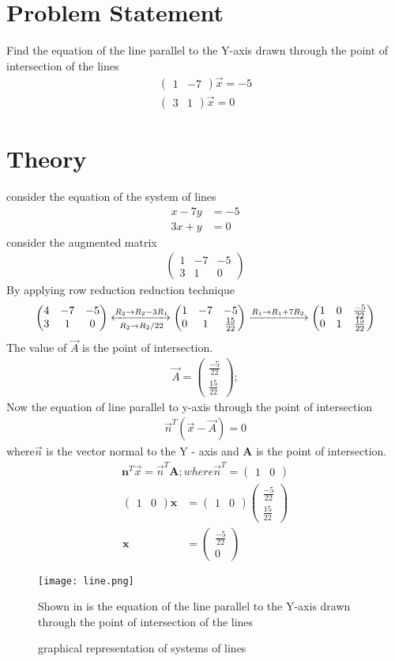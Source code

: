 \documentclass{article}
\renewcommand{\vec}[1]{\mathbf{#1}}
\newcommand{\myvec}[1]{\ensuremath{\begin{pmatrix}#1\end{pmatrix}}}
\begin{document}
\section{Problem Statement}
Find the equation of the line parallel to the Y-axis drawn through the point of intersection of the lines
\begin{align}
\myvec{1 & -7}\Vec{x}  =-5 \\ \myvec{3 & 1}\Vec{x}= 0
\end{align}
\section{Theory}
consider the equation of the system of lines
\begin{align}
x - 7y & = -5 \\
3x + y & = 0
\end{align}
 consider the augmented matrix
 \begin{align}
 \myvec{1 & -7 & -5 \\ 3 & 1 & 0}
 \end{align}
 By applying row reduction reduction technique 
 \begin{align}
\myvec{4 & -7 & -5\\ 3 & 1 & 0}
	\xleftrightarrow[R_2 \rightarrow R_2/22]{R_2 \rightarrow R_2-3R_1}
	\myvec{1 & -7 & -5 \\ 0 & 1 & \frac{15}{22}}
	\xrightarrow[]{R_1 \rightarrow R_1+7R_2}
	 \myvec{1 & 0 & \frac{-5}{22} \\ 0 & 1 & \frac{15}{22}}
 \end{align}
 The value of $\Vec{A}$ is the point of intersection.
\begin{align}
 {\Vec{A}} = \myvec{\frac{-5}{22} \\ \frac{15}{22}} ;
\end{align}
Now the equation of line parallel to y-axis through the point of intersection
\begin{align}
\Vec{n}^T(\Vec{x}-\Vec{A}) = 0
\end{align}
where$\Vec{n}$ is the vector normal to the Y - axis and $\vec{A}$ is the point of intersection.\\
\begin{align*}
\vec{n}^T \Vec{x} = \Vec{n}^T\vec{A} ; where
 \Vec{n}^T = \myvec{1 & 0}
 \end{align*}
 \begin{align}
\myvec{1 & 0}\vec{x} &  = \myvec{1 & 0} \myvec{\frac{-5}{22} \\ \frac{15}{22}}\\
\vec{x} & = \myvec{\frac{-5}{22} \\ 0} 
 \end{align}
 \begin{figure}
 \centering
 \texttt{[image: line.png]}
 \caption{graphical representation of systems of lines}
 \label{fig:lines}
 Shown in  is the equation of the line parallel to the Y-axis drawn through the point of intersection of the lines 
 \end{figure}
\end{document}
